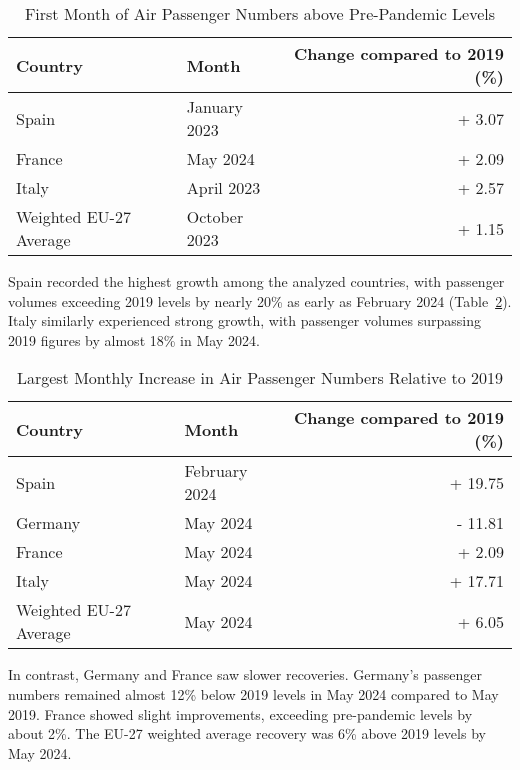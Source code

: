 \documentclass[12pt,onehalfspacing,headsepline,oneside,openright,a4paper, fleqn]{report}
\begin{document}
\begin{table}[H]
\centering
\caption{First Month of Air Passenger Numbers above Pre-Pandemic Levels}
\label{tab:first_above_100}
\begin{tabular}{llr}
\toprule
\textbf{Country} & \textbf{Month} & \textbf{Change compared to 2019 (\%)} \\
\midrule
Spain                  & January 2023   & + 3.07 \\
\cmidrule(lr){1-3}
France                 & May 2024       & + 2.09 \\
\cmidrule(lr){1-3}
Italy                  & April 2023     & + 2.57 \\
\cmidrule(lr){1-3}
Weighted EU-27 Average & October 2023   & + 1.15 \\
\bottomrule
\end{tabular}
\end{table}



Spain recorded the highest growth among the analyzed countries, with passenger volumes exceeding 2019 levels by nearly 20\% as early as February 2024 (Table~\ref{tab:highest_rebound}). Italy similarly experienced strong growth, with passenger volumes surpassing 2019 figures by almost 18\% in May 2024.

\begin{table}[H]
\centering
\caption{Largest Monthly Increase in Air Passenger Numbers Relative to 2019}
\begin{tabular}{llr}
\toprule
\textbf{Country} & \textbf{Month} & \textbf{Change compared to 2019 (\%)} \\
\midrule
Spain   & February 2024 & + 19.75 \\
\cmidrule(lr){1-3}
Germany & May 2024 & - 11.81 \\
\cmidrule(lr){1-3}
France  & May 2024 & + 2.09 \\
\cmidrule(lr){1-3}
Italy   & May 2024 & + 17.71 \\
\cmidrule(lr){1-3}
Weighted EU-27 Average & May 2024 & + 6.05 \\
\bottomrule
\end{tabular}
\label{tab:highest_rebound}
\end{table}

In contrast, Germany and France saw slower recoveries. Germany's passenger numbers remained almost 12\% below 2019 levels in May 2024 compared to May 2019. France showed slight improvements, exceeding pre-pandemic levels by about 2\%. The EU-27 weighted average recovery was 6\% above 2019 levels by May 2024.
\end{document}

